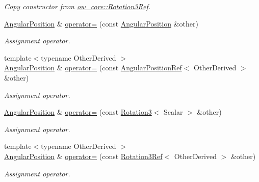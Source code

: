 \begin{DoxyCompactItemize}
\begin{DoxyCompactList}\small\item\em Copy constructor from \hyperlink{classow__core_1_1Rotation3Ref}{ow\+\_\+core\+::\+Rotation3\+Ref}. \end{DoxyCompactList}\item 
\hyperlink{classow__core_1_1AngularPosition}{Angular\+Position} \& \hyperlink{classow__core_1_1AngularPosition_adfdfcda1de326b20ec59e8ed19aaecf9}{operator=} (const \hyperlink{classow__core_1_1AngularPosition}{Angular\+Position} \&other)\hypertarget{classow__core_1_1AngularPosition_adfdfcda1de326b20ec59e8ed19aaecf9}{}\label{classow__core_1_1AngularPosition_adfdfcda1de326b20ec59e8ed19aaecf9}

\begin{DoxyCompactList}\small\item\em Assignment operator. \end{DoxyCompactList}\item 
{\footnotesize template$<$typename Other\+Derived $>$ }\\\hyperlink{classow__core_1_1AngularPosition}{Angular\+Position} \& \hyperlink{classow__core_1_1AngularPosition_ab1c24d074abac5c6cd7e44ec62143019}{operator=} (const \hyperlink{classow__core_1_1AngularPositionRef}{Angular\+Position\+Ref}$<$ Other\+Derived $>$ \&other)\hypertarget{classow__core_1_1AngularPosition_ab1c24d074abac5c6cd7e44ec62143019}{}\label{classow__core_1_1AngularPosition_ab1c24d074abac5c6cd7e44ec62143019}

\begin{DoxyCompactList}\small\item\em Assignment operator. \end{DoxyCompactList}\item 
\hyperlink{classow__core_1_1AngularPosition}{Angular\+Position} \& \hyperlink{classow__core_1_1AngularPosition_a0c39e545396b8b5f20c85eb98afa5960}{operator=} (const \hyperlink{classow__core_1_1Rotation3}{Rotation3}$<$ Scalar $>$ \&other)\hypertarget{classow__core_1_1AngularPosition_a0c39e545396b8b5f20c85eb98afa5960}{}\label{classow__core_1_1AngularPosition_a0c39e545396b8b5f20c85eb98afa5960}

\begin{DoxyCompactList}\small\item\em Assignment operator. \end{DoxyCompactList}\item 
{\footnotesize template$<$typename Other\+Derived $>$ }\\\hyperlink{classow__core_1_1AngularPosition}{Angular\+Position} \& \hyperlink{classow__core_1_1AngularPosition_a4949c9a37d6e20721da06e1823e4eab6}{operator=} (const \hyperlink{classow__core_1_1Rotation3Ref}{Rotation3\+Ref}$<$ Other\+Derived $>$ \&other)\hypertarget{classow__core_1_1AngularPosition_a4949c9a37d6e20721da06e1823e4eab6}{}\label{classow__core_1_1AngularPosition_a4949c9a37d6e20721da06e1823e4eab6}

\begin{DoxyCompactList}\small\item\em Assignment operator. \end{DoxyCompactList}\end{DoxyCompactItemize}
